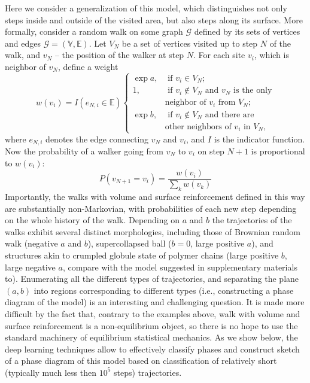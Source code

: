 \documentclass[aps,a4paper,twocolumn,showpacs]{revtex4}
\begin{document}
Here we consider a generalization of this model, which distinguishes not only steps inside and outside of the visited area, but also steps along its surface. More formally, consider a random walk on some graph $\mathcal{G}$ defined by its sets of vertices and edges $\mathcal{G} = (\mathbb{V}, \mathbb{E})$. Let $V_N$ be a set of vertices visited up to step $N$ of the walk, and $v_N$ -- the position of the walker at step $N$. For each site $v_i$, which is neighbor of $v_N$, define a weight 
\begin{equation}
    w(v_{i})=I(e_{N,i} \in \mathbb{E})\left\{
    \begin{array}{ll}
          \exp{a}, &\text{ if } v_{i} \in V_N;\\
          1, &\text { if } v_{i} \not\in V_N \text { and } v_N \text{ is the only} \\ &\text {neighbor of } v_i \text{ from } V_N ;\\
          \exp{b},&\text { if } v_{i} \not\in V_N \text { and there are } \\&\text{other neighbors of } v_i \text{ in } V_N,
    \end{array} 
\right.
\end{equation}
where $e_{N,i}$ denotes the edge connecting $v_N$ and $v_i$, and $I$ is the indicator function. Now the probability of a walker going from $v_N$ to $v_i$ on step $N+1$ is proportional to $w(v_i)$:
\begin{equation}
    P(v_{N+1} = v_{i}) = 
        \frac{w(v_{i})}{\sum_k w(v_{k})}
\end{equation}
Importantly, the walks with volume and surface reinforcement defined in this way are substantially non-Markovian, with probabilities of each new step depending on the whole history of the walk. Depending on $a$ and $b$ the trajectories of the walks exhibit several distinct morphologies, including those of Brownian random walk (negative $a$ and $b$), supercollapsed ball ($b=0$, large positive $a$), and structures akin to crumpled globule state of polymer chains\cite{gns88,grosberg93,mirny09} (large positive $b$, large negative $a$, compare with the model suggested in supplementary materials to\cite{tamm15}). Enumerating all the different types of trajectories, and separating the plane $(a,b)$ into regions corresponding to different types (i.e., constructing a phase diagram of the model) is an interesting and challenging question. It is made more difficult by the fact that, contrary to the examples above, walk with volume and surface reinforcement is a non-equilibrium object, so there is no hope to use the standard machinery of equilibrium statistical mechanics. As we show below, the deep learning techniques allow to effectively classify phases and construct sketch of a phase diagram of this model based on classification of relatively short (typically much less then $10^5$ steps) trajectories.
\end{document}
